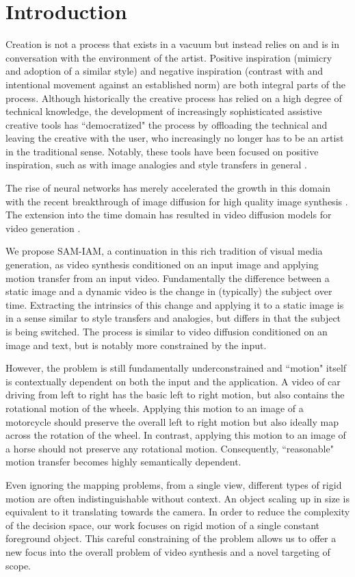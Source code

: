 \section{Introduction}
\label{sec:intro}

Creation is not a process that exists in a vacuum but instead relies on and is in conversation with the environment of the artist. Positive inspiration (mimicry and adoption of a similar style) and negative inspiration (contrast with and intentional movement against an established norm) are both integral parts of the process. Although historically the creative process has relied on a high degree of technical knowledge, the development of increasingly sophisticated assistive creative tools has ``democratized" the process by offloading the technical and leaving the creative with the user, who increasingly no longer has to be an artist in the traditional sense. Notably, these tools have been focused on positive inspiration, such as with image analogies and style transfers in general \cite{2001hertzman}.

The rise of neural networks has merely accelerated the growth in this domain with the recent breakthrough of image diffusion for high quality image synthesis \cite{ho2020denoisingdiffusionprobabilisticmodels}. The extension into the time domain has resulted in video diffusion models for video generation \cite{ho2022videodiffusionmodels}.

We propose SAM-IAM, a continuation in this rich tradition of visual media generation, as video synthesis conditioned on an input image and applying motion transfer from an input video. Fundamentally the difference between a static image and a dynamic video is the change in (typically) the subject over time. Extracting the intrinsics of this change and applying it to a static image is in a sense similar to style transfers and analogies, but differs in that the subject is being switched. The process is similar to video diffusion conditioned on an image and text, but is notably more constrained by the input.

However, the problem is still fundamentally underconstrained and ``motion" itself is contextually dependent on both the input and the application. A video of car driving from left to right has the basic left to right motion, but also contains the rotational motion of the wheels. Applying this motion to an image of a motorcycle should preserve the overall left to right motion but also ideally map across the rotation of the wheel. In contrast, applying this motion to an image of a horse should not preserve any rotational motion. Consequently, ``reasonable" motion transfer becomes highly semantically dependent.

Even ignoring the mapping problems, from a single view, different types of rigid motion are often indistinguishable without context. An object scaling up in size is equivalent to it translating towards the camera. In order to reduce the complexity of the decision space, our work focuses on rigid motion of a single constant foreground object. This careful constraining of the problem allows us to offer a new focus into the overall problem of video synthesis and a novel targeting of scope.

